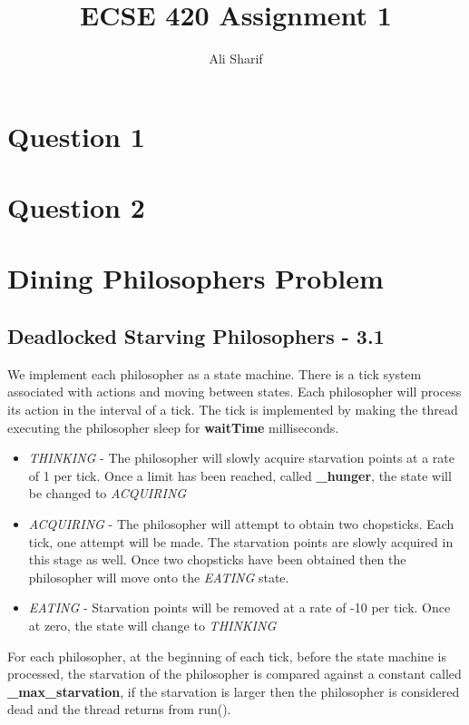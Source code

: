 \documentclass[12pt,letterpaper,titlepage]{article}
\author{Ali Sharif}
\title{ECSE 420 Assignment 1}
\begin{document}
  \maketitle
  \newpage
  \tableofcontents
  \newpage
  
  \section{Question 1}
  \section{Question 2}
  
  \section{Dining Philosophers Problem}
  \subsection{Deadlocked Starving Philosophers - 3.1}
  
  We implement each philosopher as a state machine. There is a tick system associated with actions and moving between states. Each philosopher will process its action in the interval of a tick. The tick is implemented by making the thread executing the philosopher sleep for \textbf{waitTime} milliseconds.
  
  \begin{itemize}
    \item \textit{THINKING} - The philosopher will slowly acquire starvation points at a rate of 1 per tick. Once a limit has been reached, called \textbf{\_hunger}, the state will be changed to \textit{ACQUIRING}
    \item \textit{ACQUIRING} - The philosopher will attempt to obtain two chopsticks. Each tick, one attempt will be made. The starvation points are slowly acquired in this stage as well. Once two chopsticks have been obtained then the philosopher will move onto the \textit{EATING} state.
    \item \textit{EATING} - Starvation points will be removed at a rate of -10 per tick. Once at zero, the state will change to \textit{THINKING}
  \end{itemize}
  
  For each philosopher, at the beginning of each tick, before the state machine is processed, the starvation of the philosopher is compared against a constant called \textbf{\_max\_starvation}, if the starvation is larger then the philosopher is considered dead and the thread returns from run().
  
\end{document}
